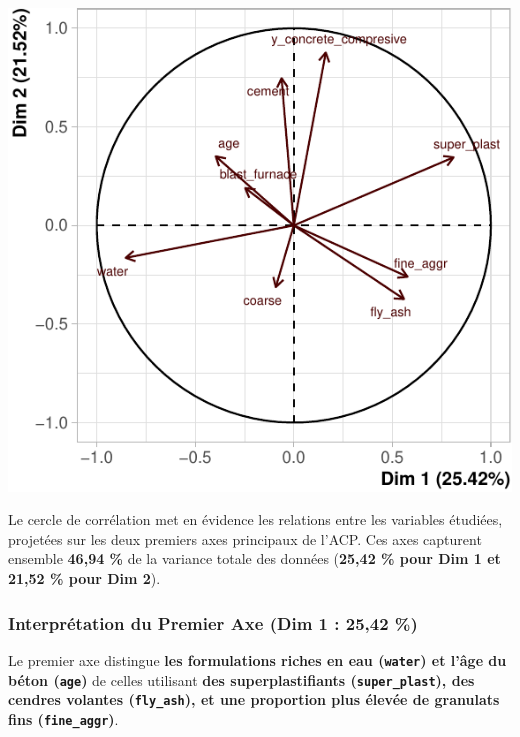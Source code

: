 \documentclass[
  12pt,
]{article}
\begin{document}
\begin{center}\includegraphics{rmd_final_files/figure-latex/unnamed-chunk-28-1} \end{center}

Le cercle de corrélation met en évidence les relations entre les
variables étudiées, projetées sur les deux premiers axes principaux de
l'ACP. Ces axes capturent ensemble \textbf{46,94 \%} de la variance
totale des données (\textbf{25,42 \% pour Dim 1 et 21,52 \% pour Dim
2}).

\subsubsection{Interprétation du Premier Axe (Dim 1 : 25,42
\%)}\label{interpruxe9tation-du-premier-axe-dim-1-2542}

Le premier axe distingue \textbf{les formulations riches en eau
(\texttt{water}) et l'âge du béton (\texttt{age})} de celles utilisant
\textbf{des superplastifiants (\texttt{super\_plast}), des cendres
volantes (\texttt{fly\_ash}), et une proportion plus élevée de granulats
fins (\texttt{fine\_aggr})}.
\end{document}
